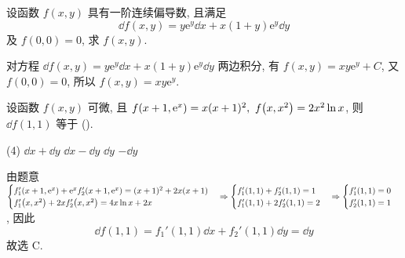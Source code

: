 \begin{example}[第九届数学竞赛决赛]
    设函数 $f(x,y)$ 具有一阶连续偏导数, 且满足 $$\dd f(x,y)=y\mathrm{e}^y\dd x+x(1+y)\mathrm{e}^y\dd y$$ 及 $f(0,0)=0$, 求 $f(x,y).$
\end{example}
\begin{solution}
    对方程 $\dd f(x,y)=y\mathrm{e}^y\dd x+x(1+y)\mathrm{e}^y\dd y$ 两边积分, 有 $f(x,y)=xy\mathrm{e}^y+C$, 又 $f(0,0)=0$, 所以 $f(x,y)=xy\mathrm{e}^y$.
\end{solution}

\begin{example}[2021 数一]
    设函数 $f(x,y)$ 可微, 且 $f\qty(x+1,\mathrm{e}^x)=x(x+1)^2,~f\qty(x,x^2)=2x^2\ln x$, 则 $\dd f(1,1)$ 等于 (\quad).
    \begin{tasks}(4)
        \task $\dd x+\dd y$
        \task $\dd x-\dd y$
        \task $\dd y$
        \task $-\dd y$
    \end{tasks}
\end{example}
\begin{solution}
    由题意 $\begin{cases}
            f_1'\qty(x+1,\mathrm{e}^x)+\mathrm{e}^xf_2'\qty(x+1,\mathrm{e}^x)=(x+1)^2+2x(x+1) \\
            f_1'\qty(x,x^2)+2xf_2'\qty(x,x^2)=4x\ln x+2x
        \end{cases}\Rightarrow \begin{cases}
            f_1'(1,1)+f_2'(1,1)=1 \\
            f_1'(1,1)+2f_2'(1,1)=2
        \end{cases}\Rightarrow \begin{cases}
            f_1'(1,1)=0 \\
            f_2'(1,1)=1
        \end{cases}$, 因此
    $$\dd f(1,1)=f_1'(1,1)\dd x+f_2'(1,1)\dd y=\dd y$$
    故选 C.
\end{solution}

